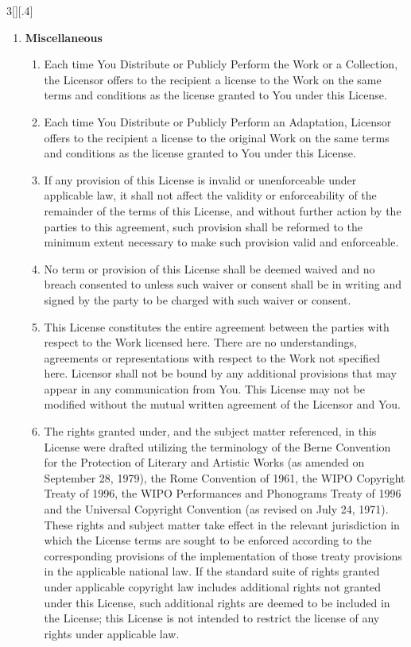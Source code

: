 \documentclass[8pt,a4paper]{article}
\begin{document}
\begin{multicols}{3}[][.4\paperwidth]
\begin{enumerate}
\begin{enumerate}
 \end{enumerate}

 \item \textbf{Miscellaneous}

 \begin{enumerate}

  \item Each time You Distribute or Publicly Perform the Work or a Collection,
        the Licensor offers to the recipient a license to the Work on the same
        terms and conditions as the license granted to You under this License.
  \item Each time You Distribute or Publicly Perform an Adaptation, Licensor
        offers to the recipient a license to the original Work on the same
        terms and conditions as the license granted to You under this License.
  \item If any provision of this License is invalid or unenforceable under
        applicable law, it shall not affect the validity or enforceability of
        the remainder of the terms of this License, and without further action
        by the parties to this agreement, such provision shall be reformed to
        the minimum extent necessary to make such provision valid and
        enforceable.
  \item No term or provision of this License shall be deemed waived and no
        breach consented to unless such waiver or consent shall be in writing
        and signed by the party to be charged with such waiver or consent.
  \item This License constitutes the entire agreement between the parties with
        respect to the Work licensed here. There are no understandings,
        agreements or representations with respect to the Work not specified
        here. Licensor shall not be bound by any additional provisions that
        may appear in any communication from You. This License may not be
        modified without the mutual written agreement of the Licensor and You.
  \item The rights granted under, and the subject matter referenced, in this
        License were drafted utilizing the terminology of the Berne Convention
        for the Protection of Literary and Artistic Works (as amended on
        September 28, 1979), the Rome Convention of 1961, the WIPO Copyright
        Treaty of 1996, the WIPO Performances and Phonograms Treaty of 1996
        and the Universal Copyright Convention (as revised on July 24, 1971).
        These rights and subject matter take effect in the relevant
        jurisdiction in which the License terms are sought to be enforced
        according to the corresponding provisions of the implementation of
        those treaty provisions in the applicable national law. If the
        standard suite of rights granted under applicable copyright law
        includes additional rights not granted under this License, such
        additional rights are deemed to be included in the License; this
        License is not intended to restrict the license of any rights under
        applicable law.


\end{enumerate}
\end{enumerate}
\end{multicols}
\end{document}
